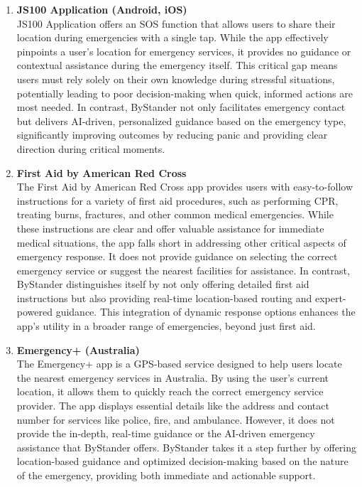 \begin{enumerate}
    \item \textbf{JS100 Application (Android, iOS)} \\
    JS100 Application offers an SOS function that allows users to share their location during emergencies with a single tap. While the app effectively pinpoints a user's location for emergency services, it provides no guidance or contextual assistance during the emergency itself. This critical gap means users must rely solely on their own knowledge during stressful situations, potentially leading to poor decision-making when quick, informed actions are most needed. In contrast, ByStander not only facilitates emergency contact but delivers AI-driven, personalized guidance based on the emergency type, significantly improving outcomes by reducing panic and providing clear direction during critical moments.
    
    \item \textbf{First Aid by American Red Cross} \\
    The First Aid by American Red Cross app provides users with easy-to-follow instructions for a variety of first aid procedures, such as performing CPR, treating burns, fractures, and other common medical emergencies. While these instructions are clear and offer valuable assistance for immediate medical situations, the app falls short in addressing other critical aspects of emergency response. It does not provide guidance on selecting the correct emergency service or suggest the nearest facilities for assistance. In contrast, ByStander distinguishes itself by not only offering detailed first aid instructions but also providing real-time location-based routing and expert-powered guidance. This integration of dynamic response options enhances the app’s utility in a broader range of emergencies, beyond just first aid.

    \item \textbf{Emergency+ (Australia)} \\
    The Emergency+ app is a GPS-based service designed to help users locate the nearest emergency services in Australia. By using the user’s current location, it allows them to quickly reach the correct emergency service provider. The app displays essential details like the address and contact number for services like police, fire, and ambulance. However, it does not provide the in-depth, real-time guidance or the AI-driven emergency assistance that ByStander offers. ByStander takes it a step further by offering location-based guidance and optimized decision-making based on the nature of the emergency, providing both immediate and actionable support.

\end{enumerate}

